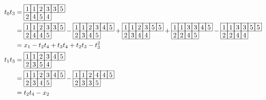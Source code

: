 \begin{align*}
t_0t_3 &= 
\begin{array}[c]{*{6}c}\cline{1-6}
\lr{1}&\lr{1}&\lr{2}&\lr{3}&\lr{3}&\lr{5}\\\cline{1-6}
\lr{2}&\lr{4}&\lr{5}&\lr{4}\\\cline{1-4}
\end{array}\\
&=
\begin{array}[c]{*{6}c}\cline{1-6}
\lr{1}&\lr{1}&\lr{2}&\lr{3}&\lr{3}&\lr{5}\\\cline{1-6}
\lr{2}&\lr{4}&\lr{4}&\lr{5}\\\cline{1-4}
\end{array}
-\begin{array}[c]{*{6}c}\cline{1-6}
\lr{1}&\lr{1}&\lr{2}&\lr{3}&\lr{4}&\lr{5}\\\cline{1-6}
\lr{2}&\lr{3}&\lr{4}&\lr{5}\\\cline{1-4}
\end{array}
+\begin{array}[c]{*{6}c}\cline{1-6}
\lr{1}&\lr{1}&\lr{2}&\lr{3}&\lr{5}&\lr{5}\\\cline{1-6}
\lr{2}&\lr{3}&\lr{4}&\lr{4}\\\cline{1-4}
\end{array}
+\begin{array}[c]{*{6}c}\cline{1-6}
\lr{1}&\lr{1}&\lr{3}&\lr{3}&\lr{4}&\lr{5}\\\cline{1-6}
\lr{2}&\lr{2}&\lr{4}&\lr{5}\\\cline{1-4}
\end{array}
-\begin{array}[c]{*{6}c}\cline{1-6}
\lr{1}&\lr{1}&\lr{3}&\lr{3}&\lr{5}&\lr{5}\\\cline{1-6}
\lr{2}&\lr{2}&\lr{4}&\lr{4}\\\cline{1-4}
\end{array}\\
&= x_1 - t_2t_4 + t_3t_4 + t_2t_3 - t_3^2\\
t_1t_3 &= 
\begin{array}[c]{*{6}c}\cline{1-6}
\lr{1}&\lr{1}&\lr{2}&\lr{3}&\lr{4}&\lr{5}\\\cline{1-6}
\lr{2}&\lr{3}&\lr{5}&\lr{4}\\\cline{1-4}
\end{array}\\
&=
\begin{array}[c]{*{6}c}\cline{1-6}
\lr{1}&\lr{1}&\lr{2}&\lr{3}&\lr{4}&\lr{5}\\\cline{1-6}
\lr{2}&\lr{3}&\lr{4}&\lr{5}\\\cline{1-4}
\end{array}
-\begin{array}[c]{*{6}c}\cline{1-6}
\lr{1}&\lr{1}&\lr{2}&\lr{4}&\lr{4}&\lr{5}\\\cline{1-6}
\lr{2}&\lr{3}&\lr{3}&\lr{5}\\\cline{1-4}
\end{array}\\
&=t_2t_4-x_2
\end{align*}
